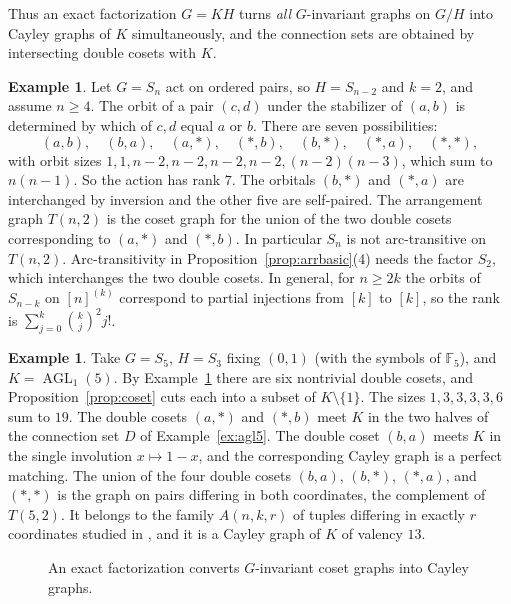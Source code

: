 \documentclass[12pt,letterpaper]{article}
\numberwithin{equation}{section}
\theoremstyle{definition}
\newtheorem{example}[theorem]{Example}
\DeclareMathOperator{\agll}{AGL}
\DeclareMathOperator{\cayy}{Cay}
\begin{document}
Thus an exact factorization $G=KH$ turns \emph{all} $G$-invariant graphs on $G/H$ into Cayley graphs of $K$ simultaneously, and the connection sets are obtained by intersecting double cosets with $K$.
\begin{example}\label{ex:orbitals}
Let $G=S_n$ act on ordered pairs, so $H=S_{n-2}$ and $k=2$, and assume $n\geq4$. The orbit of a pair $(c,d)$ under the stabilizer of $(a,b)$ is determined by which of $c,d$ equal $a$ or $b$. There are seven possibilities:
\[
(a,b),\quad(b,a),\quad(a,\ast),\quad(\ast,b),\quad(b,\ast),\quad(\ast,a),\quad(\ast,\ast),
\]
with orbit sizes $1,1,n-2,n-2,n-2,n-2,(n-2)(n-3)$, which sum to $n(n-1)$. So the action has rank $7$. The orbitals $(b,\ast)$ and $(\ast,a)$ are interchanged by inversion and the other five are self-paired. The arrangement graph $T(n,2)$ is the coset graph for the union of the two double cosets corresponding to $(a,\ast)$ and $(\ast,b)$. In particular $S_n$ is not arc-transitive on $T(n,2)$. Arc-transitivity in Proposition~\ref{prop:arrbasic}(4) needs the factor $S_2$, which interchanges the two double cosets. In general, for $n\geq2k$ the orbits of $S_{n-k}$ on $[n]^{(k)}$ correspond to partial injections from $[k]$ to $[k]$, so the rank is $\sum_{j=0}^k\binom kj^2 j!$.
\end{example}
\begin{example}
Take $G=S_5$, $H=S_3$ fixing $(0,1)$ (with the symbols of $\mathbb F_5$), and $K=\agll_1(5)$. By Example~\ref{ex:orbitals} there are six nontrivial double cosets, and Proposition~\ref{prop:coset} cuts each into a subset of $K\setminus\{1\}$. The sizes $1,3,3,3,3,6$ sum to $19$. The double cosets $(a,\ast)$ and $(\ast,b)$ meet $K$ in the two halves of the connection set $D$ of Example~\ref{ex:agl5}. The double coset $(b,a)$ meets $K$ in the single involution $x\mapsto 1-x$, and the corresponding Cayley graph is a perfect matching. The union of the four double cosets $(b,a)$, $(b,\ast)$, $(\ast,a)$, and $(\ast,\ast)$ is the graph on pairs differing in both coordinates, the complement of $T(5,2)$. It belongs to the family $A(n,k,r)$ of tuples differing in exactly $r$ coordinates studied in \cite{CGW14}, and it is a Cayley graph of $K$ of valency $13$.
\end{example}
\begin{figure}[ht]\centering
{}
\caption{An exact factorization converts $G$-invariant coset graphs into Cayley graphs.}\label{fig:coset}
\end{figure}
\end{document}

